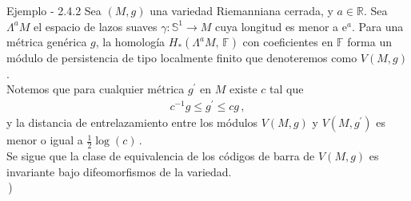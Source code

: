 \documentclass{beamer}
\begin{document}
\begin{frame}{Ejemplo - 2.4.2}
Sea $(M,g)$ una variedad Riemanniana cerrada, y $a\in\mathbb{R}$. Sea $\Lambda^{a}M$ el espacio de lazos suaves $\gamma : \mathbb{S}^{1}\rightarrow M$ cuya longitud es menor a $\mbox{e}^a$. Para una m\'etrica gen\'erica $g$, la homolog\'ia $H_{\ast}\left(\Lambda^{a}M,\,\mathbb{F} \right)$ con coeficientes en $\mathbb{F}$ forma un m\'odulo de persistencia de tipo localmente finito que denoteremos como $V(M,g)$.\\

Notemos que para cualquier m\'etrica $g^\prime $ en $M$ existe $c$ tal que 
\begin{gather*}
c^{-1}g\leq g^{\prime}\leq cg\,,
\end{gather*}
y la distancia de entrelazamiento entre los m\'odulos $V(M,g)$ y $V(M,g^\prime)$ es menor o igual a $\frac{1}{2}\log(c)\,$.\\
\vspace{0.5em}
Se sigue que la clase de equivalencia de los c\'odigos de barra de $V(M,g)$ es invariante bajo difeomorfismos de la variedad.\\ $\,$\hfill\scalebox{0.65}{(Weinberger, Found. Comput. Math. 19, 2019})
\end{frame}
\end{document}
